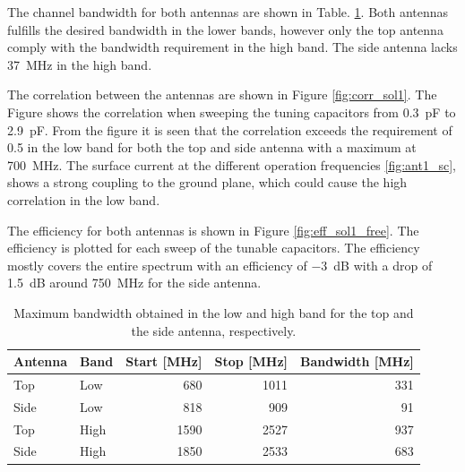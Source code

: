 The channel bandwidth for both antennas are shown in Table. \ref{tab:bw_sol1}. Both antennas fulfills the desired bandwidth in the lower bands, however only the top antenna comply with the bandwidth requirement in the high band. The side antenna lacks \SI{37}{MHz} in the high band.

The correlation between the antennas are shown in Figure \ref{fig:corr_sol1}. The Figure shows the correlation when sweeping the tuning capacitors from \SI{0.3}{pF} to \SI{2.9}{pF}. From the figure it is seen that the correlation exceeds the requirement of \num{0.5} in the low band for both the top and side antenna with a maximum at \SI{700}{MHz}. The surface current at the different operation frequencies \ref{fig:ant1_sc}, shows a strong coupling to the ground plane, which could cause the high correlation in the low band. 

The efficiency for both antennas is shown in Figure \ref{fig:eff_sol1_free}. The efficiency is plotted for each sweep of the tunable capacitors. The efficiency mostly covers the entire spectrum with an efficiency of \SI{-3}{dB} with a drop of \SI{1.5}{dB} around \SI{750}{MHz} for the side antenna. 

    \begin{table}
        \centering
        \begin{tabular}{|l|l|r|r|r|}
            \hline
            Antenna & Band & Start [MHz] & Stop [MHz] & Bandwidth [MHz] \\
            \hline
            Top     & Low  & 680         & 1011       & 331 \\
            Side    & Low  & 818         & 909        & 91 \\
            \hline
            Top     & High & 1590        & 2527       & 937 \\
            Side    & High & 1850        & 2533       & 683 \\
            \hline
        \end{tabular}
        \caption{Maximum bandwidth obtained in the low and high band for the top and the side antenna, respectively.}
        \label{tab:bw_sol1}
    \end{table}

